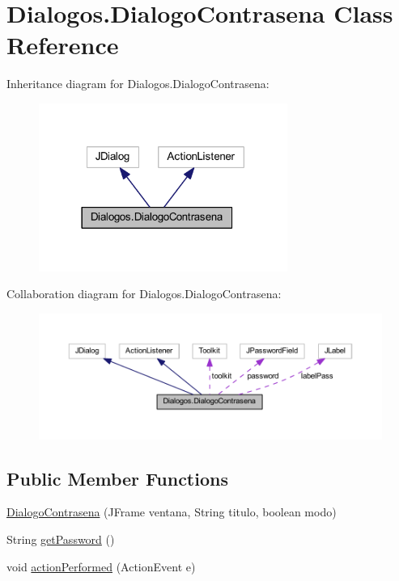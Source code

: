 \hypertarget{class_dialogos_1_1_dialogo_contrasena}{}\section{Dialogos.\+Dialogo\+Contrasena Class Reference}
\label{class_dialogos_1_1_dialogo_contrasena}


Inheritance diagram for Dialogos.\+Dialogo\+Contrasena\+:
\nopagebreak
\begin{figure}[H]
\begin{center}
\leavevmode
\includegraphics[width=230pt]{class_dialogos_1_1_dialogo_contrasena__inherit__graph}
\end{center}
\end{figure}


Collaboration diagram for Dialogos.\+Dialogo\+Contrasena\+:
\nopagebreak
\begin{figure}[H]
\begin{center}
\leavevmode
\includegraphics[width=350pt]{class_dialogos_1_1_dialogo_contrasena__coll__graph}
\end{center}
\end{figure}
\subsection*{Public Member Functions}
\begin{DoxyCompactItemize}
\item 
\mbox{\hyperlink{class_dialogos_1_1_dialogo_contrasena_a9a6b29752e63bf2be3f224eaf6fe3df8}{Dialogo\+Contrasena}} (J\+Frame ventana, String titulo, boolean modo)
\item 
String \mbox{\hyperlink{class_dialogos_1_1_dialogo_contrasena_abf0758452b6d0029f6f633a28b3449fd}{get\+Password}} ()
\item 
void \mbox{\hyperlink{class_dialogos_1_1_dialogo_contrasena_a062d6632b686a684e425754e346ae2d6}{action\+Performed}} (Action\+Event e)
\end{DoxyCompactItemize}


